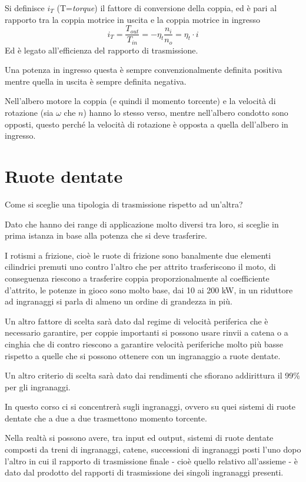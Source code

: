\documentclass[a4paper, 15pt]{article}
\begin{document}
\begin{adjustwidth}{2in}{}
	Si definisce $i_T$ (T=\textit{torque}) il fattore di conversione della coppia, ed è pari al rapporto tra la coppia motrice in uscita e la coppia motrice in ingresso
	\[i_T = \dfrac{T_{out}}{T_{in}} = -\eta_t\dfrac{n_i}{n_o} = \eta_t\cdot i\]
	Ed è legato all'efficienza del rapporto di trasmissione. \newline

	Una potenza in ingresso questa è sempre convenzionalmente definita positiva mentre quella in uscita è sempre definita negativa. 
	
	Nell'albero motore la coppia (e quindi il momento torcente) e la velocità di rotazione (sia $\omega$ che $n$) hanno lo stesso verso, mentre nell'albero condotto sono opposti, questo perché la velocità di rotazione è opposta a quella dell'albero in ingresso.
\end{adjustwidth}

\section{Ruote dentate}	
\begin{adjustwidth}{2in}{}	
	Come si sceglie una tipologia di trasmissione rispetto ad un'altra? 
	
	Dato che hanno dei range di applicazione molto diversi tra loro, si sceglie in prima istanza in base alla potenza che si deve trasferire. \newline 
	
	I rotismi a frizione, cioè le ruote di frizione sono banalmente due elementi cilindrici premuti uno contro l'altro che per attrito trasferiscono il moto, di conseguenza riescono a trasferire coppia proporzionalmente al coefficiente d'attrito, le potenze in gioco sono molto base, dai 10 ai 200 \si{\kilo\watt}, in un riduttore ad ingranaggi si parla di almeno un ordine di grandezza in più. \newline
	
	Un altro fattore di scelta sarà dato dal regime di velocità periferica che è necessario garantire, per coppie importanti si possono usare rinvii a catena o a cinghia che di contro riescono a garantire velocità periferiche molto più basse rispetto a quelle che si possono ottenere con un ingranaggio a ruote dentate. \newline
	
	Un altro criterio di scelta sarà dato dai rendimenti che sfiorano addirittura il 99\% per gli ingranaggi. \newline
	
	In questo corso ci si concentrerà sugli ingranaggi, ovvero su quei sistemi di ruote dentate che a due a due trasmettono momento torcente.
	
	Nella realtà si possono avere, tra input ed output, sistemi di ruote dentate composti da treni di ingranaggi, catene, successioni di ingranaggi posti l'uno dopo l'altro in cui il rapporto di trasmissione finale - cioè quello relativo all'assieme - è dato dal prodotto del rapporti di trasmissione dei singoli ingranaggi presenti.
\end{adjustwidth}
\end{document}
